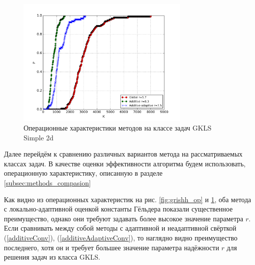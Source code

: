 \begin{figure}[H]
  \center
  \includegraphics[width=0.75\textwidth]{images/gkls-s.png}
  \caption{Операционные характеристики методов на классе задач GKLS Simple 2d}
  \label{fig:gkls_op}
\end{figure}

Далее перейдём к сравнению различных вариантов метода на рассматриваемых классах задач.
В качестве оценки эффективности алгоритма будем использовать, операционную характеристику,
описанную в разделе \ref{subsec:methods_compasion}

Как видно из операционных характеристик на рис. \ref{fig:grishh_op} и \ref{fig:gkls_op},
оба метода с локально-адаптивной оценкой константы Гёльдера показали существенное преимущество, однако они требуют
задавать более высокое значение параметра \(r\). Если сравнивать между собой методы с
адаптивной и неадаптивной свёрткой (\ref{additiveConv}), (\ref{additiveAdaptiveConv}), то наглядно видно преимущество последнего,
хотя он и требует большее значение параметра надёжности \(r\) для решения задач из класса GKLS.

